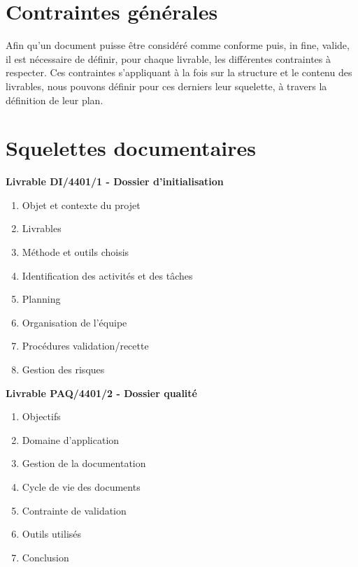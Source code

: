 
\section{Contraintes générales}

Afin qu’un document puisse être considéré comme conforme puis, in fine, valide, il est nécessaire de définir, pour chaque livrable, les différentes contraintes à respecter. Ces contraintes s’appliquant à la fois sur la structure et le contenu des livrables, nous pouvons définir pour ces derniers leur squelette, à travers la définition de leur plan.

\section{Squelettes documentaires}

\bf{Livrable DI/4401/1 - Dossier d’initialisation} \\

\begin{enumerate}
    \item Objet et contexte du projet
    \item Livrables
    \item Méthode et outils choisis
    \item Identification des activités et des tâches
    \item Planning
    \item Organisation de l’équipe
    \item Procédures validation/recette
    \item Gestion des risques \\
\end{enumerate}

\bf{Livrable PAQ/4401/2 - Dossier qualité} \\

\begin{enumerate}
    \item Objectifs
    \item Domaine d'application
    \item Gestion de la documentation
    \item Cycle de vie des documents
    \item Contrainte de validation 
    \item Outils utilisés
    \item Conclusion \\
\end{enumerate}

